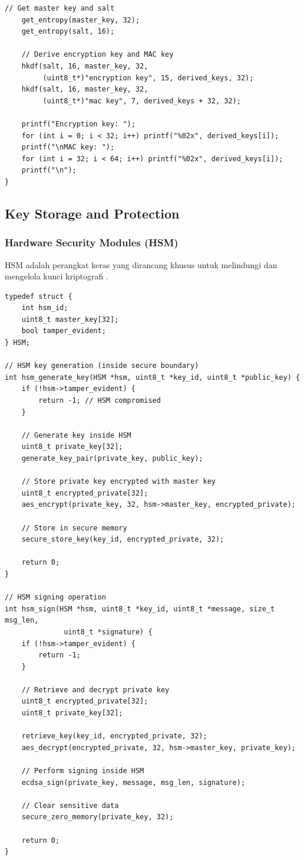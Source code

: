 \begin{lstlisting}[style=cstyle, caption={HKDF Implementation}]
    // Get master key and salt
    get_entropy(master_key, 32);
    get_entropy(salt, 16);
    
    // Derive encryption key and MAC key
    hkdf(salt, 16, master_key, 32, 
         (uint8_t*)"encryption key", 15, derived_keys, 32);
    hkdf(salt, 16, master_key, 32, 
         (uint8_t*)"mac key", 7, derived_keys + 32, 32);
    
    printf("Encryption key: ");
    for (int i = 0; i < 32; i++) printf("%02x", derived_keys[i]);
    printf("\nMAC key: ");
    for (int i = 32; i < 64; i++) printf("%02x", derived_keys[i]);
    printf("\n");
}
\end{lstlisting}

\subsection{Key Storage and Protection}

\subsubsection{Hardware Security Modules (HSM)}

HSM adalah perangkat keras yang dirancang khusus untuk melindungi dan mengelola kunci kriptografi \cite{nist800_57}.

\begin{lstlisting}[style=cstyle, caption={HSM Interface}]
typedef struct {
    int hsm_id;
    uint8_t master_key[32];
    bool tamper_evident;
} HSM;

// HSM key generation (inside secure boundary)
int hsm_generate_key(HSM *hsm, uint8_t *key_id, uint8_t *public_key) {
    if (!hsm->tamper_evident) {
        return -1; // HSM compromised
    }
    
    // Generate key inside HSM
    uint8_t private_key[32];
    generate_key_pair(private_key, public_key);
    
    // Store private key encrypted with master key
    uint8_t encrypted_private[32];
    aes_encrypt(private_key, 32, hsm->master_key, encrypted_private);
    
    // Store in secure memory
    secure_store_key(key_id, encrypted_private, 32);
    
    return 0;
}

// HSM signing operation
int hsm_sign(HSM *hsm, uint8_t *key_id, uint8_t *message, size_t msg_len,
              uint8_t *signature) {
    if (!hsm->tamper_evident) {
        return -1;
    }
    
    // Retrieve and decrypt private key
    uint8_t encrypted_private[32];
    uint8_t private_key[32];
    
    retrieve_key(key_id, encrypted_private, 32);
    aes_decrypt(encrypted_private, 32, hsm->master_key, private_key);
    
    // Perform signing inside HSM
    ecdsa_sign(private_key, message, msg_len, signature);
    
    // Clear sensitive data
    secure_zero_memory(private_key, 32);
    
    return 0;
}
\end{lstlisting}

